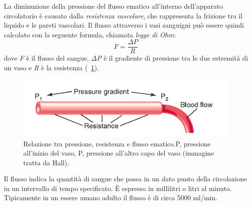 La diminuzione della pressione del flusso ematico all'interno dell'apparato circolatorio è causato dalla \textit{resistenza vascolare}, che rappresenta la frizione tra il liquido e le pareti vascolari. Il flusso attraverso i vasi sanguigni può essere quindi calcolato con la seguente formula, chiamata \textit{legge di Ohm}:
\begin{equation}
	F=\frac{\Delta P}{R}
	\label{eq:OhmsLaw}
\end{equation}
dove \textit{F} è il flusso del sangue, \textit{$\Delta$P} è il gradiente di pressione tra le due estremità di un vaso e \textit{R} è la resistenza  (\Fig~\ref{fig:FlussoSangue}).
\begin{figure}[tb]
	\centering
	\includegraphics[width=0.7\linewidth]{ImageFiles/Fotopletismografia/FlussoSangue}
	\caption{Relazione tra pressione, resistenza e flusso ematico.P, pressione all'inizio del vaso, P, pressione all'altro capo del vaso (immagine tratta da Hall\cite{Hall2016}).}
	\label{fig:FlussoSangue}
\end{figure}
\par Il flusso indica la quantità di sangue che passa in un dato punto della circolazione in un intervallo di tempo specificato. \`E espresso in millilitri o litri al minuto. Tipicamente in un essere umano adulto il flusso è di circa 5000 ml/min.


